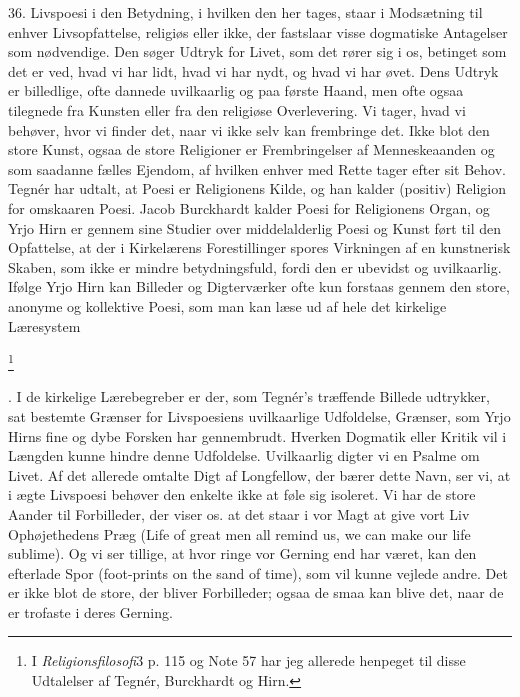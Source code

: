\documentclass[12pt]{article}
\newcommand{\apage}[1]{\marginnote{\footnotesize\textit{[#1]}}}
\begin{document}
36. Livspoesi i den Betydning, i hvilken den her tages, staar i Modsætning til
enhver Livsopfattelse, religiøs eller ikke, der fastslaar visse dogmatiske
Antagelser som nødvendige. Den søger Udtryk for Livet, som det rører sig i os,
betinget som det er ved, hvad vi har lidt, hvad vi har nydt, og hvad vi har
øvet. Dens Udtryk er billedlige, ofte dannede uvilkaarlig og paa første Haand,
men ofte ogsaa tilegnede fra Kunsten eller fra den religiøse Overlevering. Vi
tager, hvad vi behøver, hvor vi finder det, naar vi ikke selv kan frembringe
det. Ikke blot den store Kunst, ogsaa de store Religioner er Frembringelser af
Menneskeaanden og som saadanne fælles Ejendom, af hvilken enhver med Rette
tager efter sit Behov. Tegnér har udtalt, at Poesi er Religionens Kilde, og han
kalder (positiv) Religion
\setcounter{footnote}{0}%
\apage{119}for \guillemotright{}omskaaren Poesi\guillemotleft{}. Jacob
Burckhardt kalder Poesi for Religionens Organ, og Yrjo Hirn er gennem sine
Studier over middelalderlig Poesi og Kunst ført til den Opfattelse, at der i
Kirkelærens Forestillinger spores \guillemotright{}Virkningen af en kunstnerisk
Skaben, som ikke er mindre betydningsfuld, fordi den er ubevidst og
uvilkaarlig.\guillemotleft{} Ifølge Yrjo Hirn kan Billeder og Digterværker ofte
kun forstaas gennem \guillemotright{}den store, anonyme og kollektive Poesi,
som man kan læse ud af hele det kirkelige Læresystem\guillemotleft{}

         \footnote{I \textit{Religionsfilosofi}3 p. 115 og Note 57 har jeg
allerede henpeget til disse Udtalelser af Tegnér, Burckhardt og Hirn.}

      . I de kirkelige Lærebegreber er der, som Tegnér's træffende Billede
udtrykker, sat bestemte Grænser for Livspoesiens uvilkaarlige Udfoldelse,
Grænser, som Yrjo Hirns fine og dybe Forsken har gennembrudt. Hverken Dogmatik
eller Kritik vil i Længden kunne hindre denne Udfoldelse. Uvilkaarlig digter vi
\guillemotright{}en Psalme om Livet\guillemotleft{}. Af det allerede omtalte
Digt af Longfellow, der bærer dette Navn, ser vi, at i ægte Livspoesi behøver
den enkelte ikke at føle sig isoleret. Vi har de store Aander til Forbilleder,
der viser os. at det staar i vor Magt at give vort Liv Ophøjethedens Præg (Life
of great men all remind us, we can make our life sublime). Og vi ser tillige,
at hvor ringe vor Gerning end har været, kan den efterlade Spor (foot-prints on
the sand of time), som vil kunne vejlede andre. Det er ikke blot de store, der
bliver Forbilleder; ogsaa de smaa kan blive det, naar de er trofaste i deres Gerning.
\end{document}

